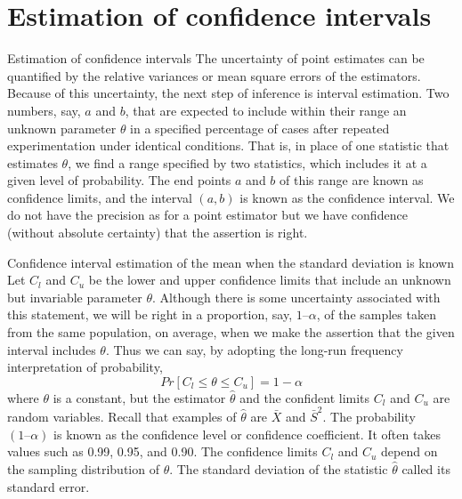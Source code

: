 \documentclass[8pt]{beamer}
\renewcommand{\emph}[1]{\textcolor{myorange}{#1}}
\begin{document}
\section{Estimation of confidence intervals}
\begin{frame}{Estimation of confidence intervals}
    The uncertainty of point estimates can be quantified by the relative variances or mean square errors of the estimators. Because of this uncertainty, the next step of inference is \alert{interval estimation}. Two numbers, say, $a$ and $b$, that are expected to include within their range an unknown parameter $\theta$ in a specified percentage of cases after repeated experimentation under identical conditions. That is, in place of one statistic that estimates $\theta$, we find a range specified by two statistics, which includes it at a given level of probability. The end points $a$ and $b$ of this range are known as \alert{confidence limits}, and the interval $(a, b)$ is known as the \alert{confidence interval}. We do not have the precision as for a point estimator but we have confidence (without absolute certainty) that the assertion is right.

\begin{block}{Confidence interval estimation of the mean when the standard deviation is known}
    Let $C_l$ and $C_u$ be the \emph{lower} and \emph{upper} confidence limits that include an unknown but invariable parameter $\theta$. Although there is some uncertainty associated with this statement, we will be right in a proportion, say, $1 – \alpha$, of the samples taken from the same population, on average, when we make the assertion that the given interval includes $\theta$. Thus we can say, by adopting the long-run frequency interpretation of probability,
\[
    Pr[C_l  \leq \theta \leq C_u ] = 1 - \alpha
\]
where $\theta$ is a constant, but the estimator $\hat{\theta}$  and the confident limits $C_l$ and $C_u$ are random variables. Recall that examples of $\hat{\theta}$ are $\bar{X}$ and $\bar{S}^2$. The probability $(1 – \alpha)$ is known as the \emph{confidence level} or \emph{confidence coefficient}. It often takes values such as 0.99, 0.95, and 0.90. The confidence limits $C_l$ and $C_u$ depend on the sampling distribution of $\theta$. The standard deviation of the statistic $\hat{\theta}$ called its \emph{standard error}.

    \end{block}
\end{frame}
\end{document}
